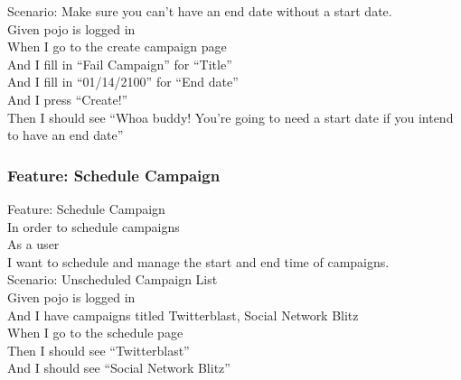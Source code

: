 \documentclass[12pt]{article}
\begin{document}
Scenario: Make sure you can't have an end date without a start date. \\
  Given pojo is logged in \\
  When I go to the create campaign page \\
  And I fill in ``Fail Campaign'' for ``Title'' \\
  And I fill in ``01/14/2100'' for ``End date'' \\
  And I press ``Create!'' \\
  Then I should see ``Whoa buddy! You're going to need a start date if you intend to have an end date'' \\

\subsubsection{Feature: Schedule Campaign}

Feature: Schedule Campaign \\
  In order to schedule campaigns \\
  As a user \\
  I want to schedule and manage the start and end time of campaigns. \\

Scenario: Unscheduled Campaign List \\
  Given pojo is logged in \\
  And I have campaigns titled Twitterblast, Social Network Blitz \\
  When I go to the schedule page \\
  Then I should see ``Twitterblast'' \\
  And I should see ``Social Network Blitz'' \\
\end{document}
